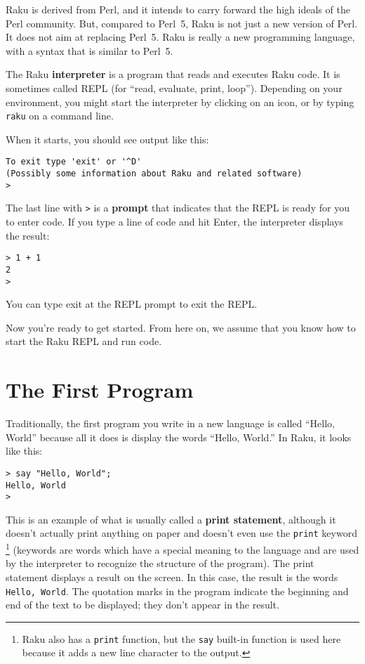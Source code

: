 Raku is derived from Perl, and it intends to carry forward the 
high ideals of the Perl community. But, compared to Perl~5, 
Raku is not just a new version of Perl. It does not 
aim at replacing Perl~5. Raku is really a new programming language, 
with a syntax that is similar to Perl~5.

The Raku {\bf interpreter} is a program that reads and 
executes Raku code. It is sometimes called REPL (for ``read, 
evaluate, print, loop''). Depending on your environment, you 
might start the interpreter by clicking on an icon, or by 
typing {\tt raku} on a command line.

When it starts, you should see output like this:

\begin{verbatim}
To exit type 'exit' or '^D'
(Possibly some information about Raku and related software)
> 
\end{verbatim}
%

The last line with {\tt >} is a {\bf prompt} that indicates 
that the REPL is ready for you to enter code. If you type a 
line of code and hit Enter, the interpreter displays the
result: 

\begin{verbatim}
> 1 + 1
2
>
\end{verbatim}
%
You can type exit at the REPL prompt to exit the REPL.

Now you're ready to get started.
From here on, we assume that you know how to start the Raku
REPL and run code.


\section{The First Program}
\label{hello}

Traditionally, the first program you write in a new language
is called ``Hello, World'' because all it does is display the
words ``Hello, World.''  In Raku, it looks like this:

\begin{verbatim}
> say "Hello, World";
Hello, World
>
\end{verbatim}
%
This is an example of what is usually called a {\bf print statement}, although it
doesn't actually print anything on paper and doesn't even 
use the {\tt print} keyword \footnote{Raku also has a {\tt print} 
function, but the {\tt say} built-in function is used here 
because it adds a new line character to the output.} (keywords are 
words which have a special meaning to the language and are 
used by the interpreter to recognize the structure of the program).  
The print statement displays a result on the screen.  In this case, 
the result is the words {\tt Hello, World}.
%
The quotation marks in the program indicate the beginning and end
of the text to be displayed; they don't appear in the result.

